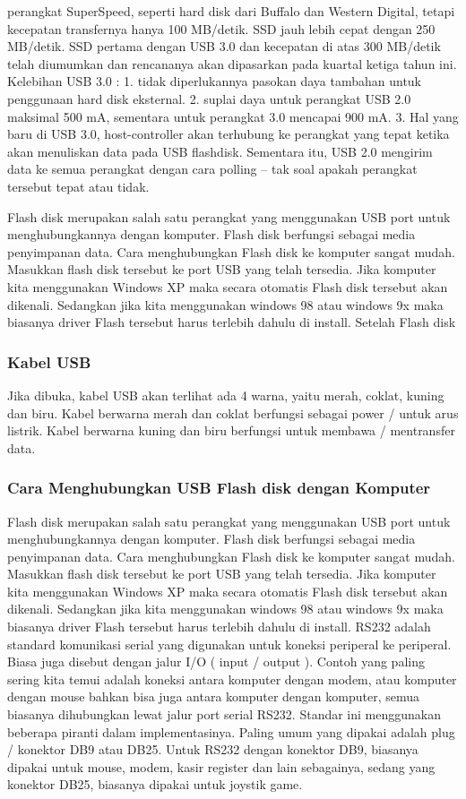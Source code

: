 perangkat Super­Speed, seperti hard disk dari Buffalo dan Western Digital, tetapi kecepatan transfernya hanya 100 MB/detik. SSD jauh lebih cepat dengan 250 MB/detik. SSD pertama dengan USB 3.0 dan kecepatan di atas 300 MB/detik telah diumumkan dan rencananya akan dipasarkan pada kuartal ketiga tahun ini.
 Kelebihan USB 3.0 :
 1. tidak diperlukannya pasokan daya tambahan untuk penggunaan hard disk eksternal.
 2. suplai daya untuk perangkat USB 2.0 maksimal 500 mA, sementara untuk perangkat 3.0 mencapai 900 mA.
 3. Hal yang baru di USB 3.0, host-controller akan terhubung ke perangkat yang tepat ketika akan menuliskan data pada USB flashdisk. Sementara itu, USB 2.0 mengirim data ke semua perangkat de­ngan cara polling – tak soal apakah perangkat tersebut tepat atau tidak.

Flash disk merupakan salah satu perangkat yang menggunakan USB port untuk menghubungkannya dengan komputer. Flash disk berfungsi sebagai media penyimpanan data. Cara menghubungkan Flash disk ke komputer sangat mudah. Masukkan flash disk tersebut ke port USB yang telah tersedia. Jika komputer kita menggunakan Windows XP maka secara otomatis Flash disk tersebut akan dikenali. Sedangkan jika kita menggunakan windows 98 atau windows 9x maka biasanya driver Flash tersebut harus terlebih dahulu di install. Setelah Flash disk

\subsubsection{Kabel USB}
Jika dibuka, kabel USB akan terlihat ada 4 warna, yaitu merah, coklat, kuning dan biru. Kabel berwarna merah dan coklat berfungsi sebagai power / untuk arus listrik. Kabel berwarna kuning dan biru berfungsi untuk membawa / mentransfer data.
\subsubsection{Cara Menghubungkan USB Flash disk dengan Komputer }
Flash disk merupakan salah satu perangkat yang menggunakan USB port untuk menghubungkannya dengan komputer. Flash disk berfungsi sebagai media penyimpanan data. Cara menghubungkan Flash disk ke komputer sangat mudah. Masukkan flash disk tersebut ke port USB yang telah tersedia. Jika komputer kita menggunakan Windows XP maka secara otomatis Flash disk tersebut akan dikenali. Sedangkan jika kita menggunakan windows 98 atau windows 9x maka biasanya driver Flash tersebut harus terlebih dahulu di install. 
RS232 adalah standard komunikasi serial yang digunakan untuk koneksi periperal ke periperal. Biasa juga disebut dengan jalur I/O ( input / output ). Contoh yang paling sering kita temui adalah koneksi antara komputer dengan modem, atau komputer dengan mouse bahkan bisa juga antara komputer dengan komputer, semua biasanya dihubungkan lewat jalur port serial RS232. 
Standar ini menggunakan beberapa piranti dalam implementasinya. Paling umum yang dipakai adalah plug / konektor DB9 atau DB25. Untuk RS232 dengan konektor DB9, biasanya dipakai untuk mouse, modem, kasir register dan lain sebagainya, sedang yang konektor DB25, biasanya dipakai untuk joystik game.

